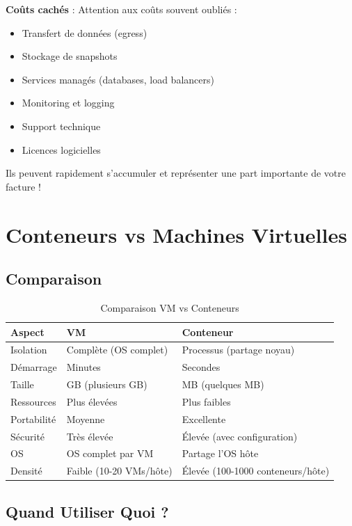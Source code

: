 \documentclass[11pt,a4paper]{article}
\begin{document}
\begin{dangerbox}
\textbf{Coûts cachés} : Attention aux coûts souvent oubliés :
\begin{itemize}
    \item Transfert de données (egress)
    \item Stockage de snapshots
    \item Services managés (databases, load balancers)
    \item Monitoring et logging
    \item Support technique
    \item Licences logicielles
\end{itemize}
Ils peuvent rapidement s'accumuler et représenter une part importante de votre facture !
\end{dangerbox}

\section{Conteneurs vs Machines Virtuelles}

\subsection{Comparaison}

\begin{table}[h]
\centering
\begin{tabular}{|l|l|l|}
\hline
\textbf{Aspect} & \textbf{VM} & \textbf{Conteneur} \\
\hline
Isolation & Complète (OS complet) & Processus (partage noyau) \\
Démarrage & Minutes & Secondes \\
Taille & GB (plusieurs GB) & MB (quelques MB) \\
Ressources & Plus élevées & Plus faibles \\
Portabilité & Moyenne & Excellente \\
Sécurité & Très élevée & Élevée (avec configuration) \\
OS & OS complet par VM & Partage l'OS hôte \\
Densité & Faible (10-20 VMs/hôte) & Élevée (100-1000 conteneurs/hôte) \\
\hline
\end{tabular}
\caption{Comparaison VM vs Conteneurs}
\end{table}

\subsection{Quand Utiliser Quoi ?}
\end{document}
